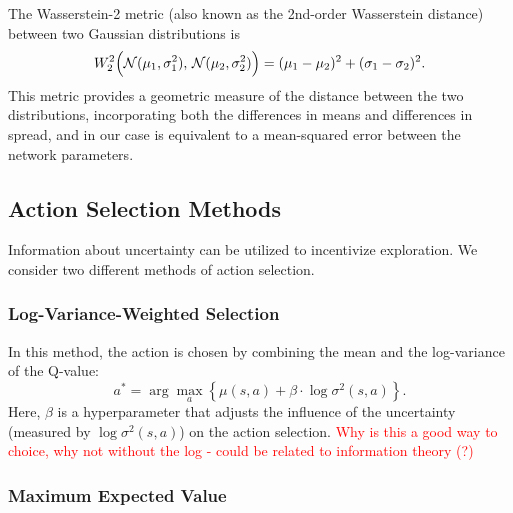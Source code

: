 \documentclass[12pt,a4paper]{report}
\newcommand\myworries[1]{\textcolor{red}{#1}}
\begin{document}
The Wasserstein-2 metric (also known as the 2nd-order Wasserstein distance) between two Gaussian distributions is
\[
  W_2^2\Bigl(\mathcal{N}(\mu_1, \sigma_1^2),\,\mathcal{N}(\mu_2, \sigma_2^2)\Bigr)
  = (\mu_1 - \mu_2)^2 + (\sigma_1 - \sigma_2)^2.
\]
This metric provides a geometric measure of the distance between the two distributions, incorporating both the differences in means and differences in spread, and in our case is equivalent to a mean-squared error between the network parameters.

\subsection{Action Selection Methods}

Information about uncertainty can be utilized to incentivize exploration. We consider two different methods of action selection.

\subsubsection{Log-Variance-Weighted Selection}
In this method, the action is chosen by combining the mean and the log-variance of the Q-value:
\[
  a^* = \arg\max_{a} \left\{ \mu(s, a) + \beta \cdot \log \sigma^2(s, a) \right\}.
\]
Here, \(\beta\) is a hyperparameter that adjusts the influence of the uncertainty (measured by \(\log \sigma^2(s,a)\)) on the action selection. \myworries{Why is this a good way to choice, why not without the log - could be related to information theory (?)}

\subsubsection{Maximum Expected Value}
\end{document}
